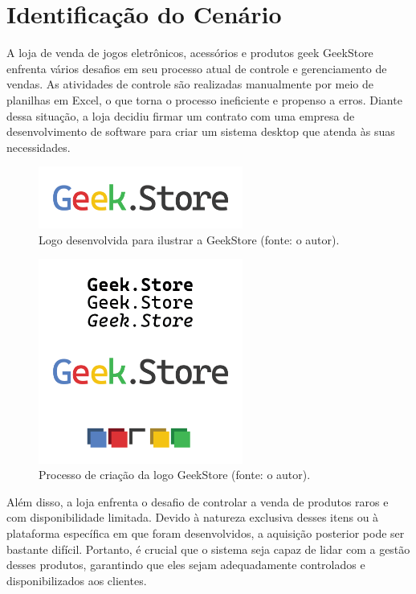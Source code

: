 \documentclass[
	12pt,				%
	openright,			%
	twoside,			%
	a4paper,			%
	english,			%
	brazil				%
	]{abntex2}
\begin{document}
\section{Identificação do Cenário}
A loja de venda de jogos eletrônicos, acessórios e produtos geek GeekStore enfrenta vários desafios em seu processo atual de controle e gerenciamento de vendas. As atividades de controle são realizadas manualmente por meio de planilhas em Excel, o que torna o processo ineficiente e propenso a erros. Diante dessa situação, a loja decidiu firmar um contrato com uma empresa de desenvolvimento de software para criar um sistema desktop que atenda às suas necessidades.

\begin{figure}[htb]
	\centering
	\includegraphics[width=0.6\textwidth]{img/geekstore/Artboard 2.png}
	\caption{Logo desenvolvida para ilustrar a GeekStore (fonte: o autor).}
	\label{fig:logo-geekstore}
\end{figure}

\begin{figure}[htb]
	\centering
	\includegraphics[width=0.6\textwidth]{img/geekstore/Artboard 1.png}
	\caption{Processo de criação da logo GeekStore (fonte: o autor).}
	\label{fig:criacao-logo-geekstore}
\end{figure}

Além disso, a loja enfrenta o desafio de controlar a venda de produtos raros e com disponibilidade limitada. Devido à natureza exclusiva desses itens ou à plataforma específica em que foram desenvolvidos, a aquisição posterior pode ser bastante difícil. Portanto, é crucial que o sistema seja capaz de lidar com a gestão desses produtos, garantindo que eles sejam adequadamente controlados e disponibilizados aos clientes.
\end{document}
